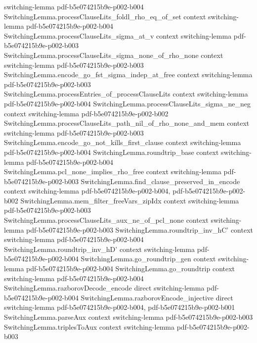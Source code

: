 \begin{theorem}
  {switching-lemma}
  {pdf-b5e074215b9e-p002-b004}
\proofstep
  {SwitchingLemma.processClauseLits_foldl_rho_eq_of_set}
  {context}
  {switching-lemma}
  {pdf-b5e074215b9e-p002-b004}
\proofstep
  {SwitchingLemma.processClauseLits_sigma_at_v}
  {context}
  {switching-lemma}
  {pdf-b5e074215b9e-p002-b003}
\proofstep
  {SwitchingLemma.processClauseLits_sigma_none_of_rho_none}
  {context}
  {switching-lemma}
  {pdf-b5e074215b9e-p002-b003}
\proofstep
  {SwitchingLemma.encode_go_fst_sigma_indep_at_free}
  {context}
  {switching-lemma}
  {pdf-b5e074215b9e-p002-b003}
\proofstep
  {SwitchingLemma.processEntries_of_processClauseLits}
  {context}
  {switching-lemma}
  {pdf-b5e074215b9e-p002-b004}
\proofstep
  {SwitchingLemma.processClauseLits_sigma_ne_neg}
  {context}
  {switching-lemma}
  {pdf-b5e074215b9e-p002-b002}
\proofstep
  {SwitchingLemma.processClauseLits_path_nil_of_rho_none_and_mem}
  {context}
  {switching-lemma}
  {pdf-b5e074215b9e-p002-b003}
\proofstep
  {SwitchingLemma.encode_go_not_kills_first_clause}
  {context}
  {switching-lemma}
  {pdf-b5e074215b9e-p002-b004}
\proofstep
  {SwitchingLemma.roundtrip_base}
  {context}
  {switching-lemma}
  {pdf-b5e074215b9e-p002-b004}
\proofstep
  {SwitchingLemma.pcl_none_implies_rho_free}
  {context}
  {switching-lemma}
  {pdf-b5e074215b9e-p002-b003}
\proofstep
  {SwitchingLemma.find_clause_preserved_in_encode}
  {context}
  {switching-lemma}
  {pdf-b5e074215b9e-p002-b004,
    pdf-b5e074215b9e-p002-b002}
\proofstep
  {SwitchingLemma.mem_filter_freeVars_zipIdx}
  {context}
  {switching-lemma}
  {pdf-b5e074215b9e-p002-b003}
\proofstep
  {SwitchingLemma.processClauseLits_aux_ne_of_pcl_none}
  {context}
  {switching-lemma}
  {pdf-b5e074215b9e-p002-b003}
\proofstep
  {SwitchingLemma.roundtrip_inv_hC'}
  {context}
  {switching-lemma}
  {pdf-b5e074215b9e-p002-b004}
\proofstep
  {SwitchingLemma.roundtrip_inv_hD'}
  {context}
  {switching-lemma}
  {pdf-b5e074215b9e-p002-b004}
\proofstep
  {SwitchingLemma.go_roundtrip_gen}
  {context}
  {switching-lemma}
  {pdf-b5e074215b9e-p002-b004}
\proofstep
  {SwitchingLemma.go_roundtrip}
  {context}
  {switching-lemma}
  {pdf-b5e074215b9e-p002-b004}
\proofstep
  {SwitchingLemma.razborovDecode_encode}
  {direct}
  {switching-lemma}
  {pdf-b5e074215b9e-p002-b004}
\proofstep
  {SwitchingLemma.razborovEncode_injective}
  {direct}
  {switching-lemma}
  {pdf-b5e074215b9e-p002-b004,
    pdf-b5e074215b9e-p002-b001}
\proofstep
  {SwitchingLemma.parseAux}
  {context}
  {switching-lemma}
  {pdf-b5e074215b9e-p002-b003}
\proofstep
  {SwitchingLemma.triplesToAux}
  {context}
  {switching-lemma}
  {pdf-b5e074215b9e-p002-b003}

\end{theorem}
